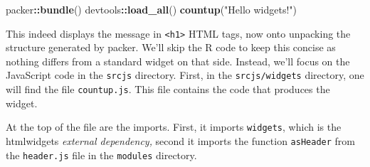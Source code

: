 \documentclass[10pt,]{krantz}
\makeatletter
\newenvironment{Shaded}{\begin{snugshade}}{\end{snugshade}}
\newcommand{\KeywordTok}[1]{\textcolor[rgb]{0.27,0.27,0.27}{\textbf{#1}}}
\newcommand{\NormalTok}[1]{#1}
\newcommand{\OperatorTok}[1]{\textcolor[rgb]{0.43,0.43,0.43}{\textbf{#1}}}
\newcommand{\StringTok}[1]{\textcolor[rgb]{0.5,0.5,0.5}{#1}}
\newenvironment{kframe}{%
\medskip{}
\setlength{\fboxsep}{.8em}
 \def\at@end@of@kframe{}%
 \ifinner\ifhmode%
  \def\at@end@of@kframe{\end{minipage}}%
  \begin{minipage}{\columnwidth}%
 \fi\fi%
 \def\FrameCommand##1{\hskip\@totalleftmargin \hskip-\fboxsep
 \colorbox{shadecolor}{##1}\hskip-\fboxsep
     \hskip-\linewidth \hskip-\@totalleftmargin \hskip\columnwidth}%
 \MakeFramed {\advance\hsize-\width
   \@totalleftmargin\z@ \linewidth\hsize
   \@setminipage}}%
 {\par\unskip\endMakeFramed%
 \at@end@of@kframe}
\renewenvironment{Shaded}{\begin{kframe}}{\end{kframe}}
\makeatother
\begin{document}
\begin{Shaded}
\begin{Highlighting}[]
\NormalTok{packer}\OperatorTok{::}\KeywordTok{bundle}\NormalTok{()}
\NormalTok{devtools}\OperatorTok{::}\KeywordTok{load_all}\NormalTok{()}
\KeywordTok{countup}\NormalTok{(}\StringTok{"Hello widgets!"}\NormalTok{)}
\end{Highlighting}
\end{Shaded}

This indeed displays the message in \texttt{\textless{}h1\textgreater{}} HTML tags, now onto unpacking the structure generated by packer. We'll skip the R code to keep this concise as nothing differs from a standard widget on that side. Instead, we'll focus on the JavaScript code in the \texttt{srcjs} directory. First, in the \texttt{srcjs/widgets} directory, one will find the file \texttt{countup.js}. This file contains the code that produces the widget.

At the top of the file are the imports. First, it imports \texttt{widgets}, which is the htmlwidgets \emph{external dependency,} second it imports the function \texttt{asHeader} from the \texttt{header.js} file in the \texttt{modules} directory.
\end{document}
